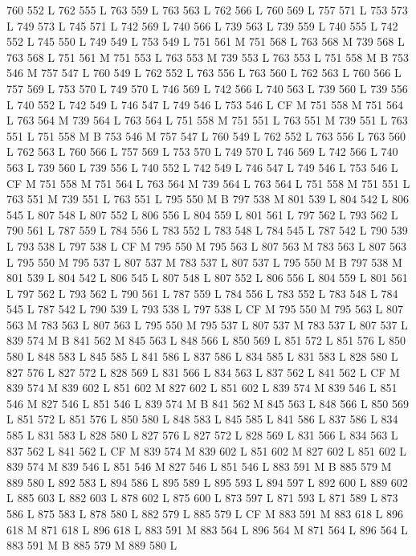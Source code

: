{{{{{{{{{{{{{{{{{{760 552 L
762 555 L
763 559 L
763 563 L
762 566 L
760 569 L
757 571 L
753 573 L
749 573 L
745 571 L
742 569 L
740 566 L
739 563 L
739 559 L
740 555 L
742 552 L
745 550 L
749 549 L
753 549 L
751 561 M 751 568 L
763 568 M 739 568 L
763 568 L
751 561 M 751 553 L
763 553 M 739 553 L
763 553 L
751 558 M B
753 546 M 757 547 L
760 549 L
762 552 L
763 556 L
763 560 L
762 563 L
760 566 L
757 569 L
753 570 L
749 570 L
746 569 L
742 566 L
740 563 L
739 560 L
739 556 L
740 552 L
742 549 L
746 547 L
749 546 L
753 546 L
CF M
751 558 M 751 564 L
763 564 M 739 564 L
763 564 L
751 558 M 751 551 L
763 551 M 739 551 L
763 551 L
751 558 M B
753 546 M 757 547 L
760 549 L
762 552 L
763 556 L
763 560 L
762 563 L
760 566 L
757 569 L
753 570 L
749 570 L
746 569 L
742 566 L
740 563 L
739 560 L
739 556 L
740 552 L
742 549 L
746 547 L
749 546 L
753 546 L
CF M
751 558 M 751 564 L
763 564 M 739 564 L
763 564 L
751 558 M 751 551 L
763 551 M 739 551 L
763 551 L
795 550 M B
797 538 M 801 539 L
804 542 L
806 545 L
807 548 L
807 552 L
806 556 L
804 559 L
801 561 L
797 562 L
793 562 L
790 561 L
787 559 L
784 556 L
783 552 L
783 548 L
784 545 L
787 542 L
790 539 L
793 538 L
797 538 L
CF M
795 550 M 795 563 L
807 563 M 783 563 L
807 563 L
795 550 M 795 537 L
807 537 M 783 537 L
807 537 L
795 550 M B
797 538 M 801 539 L
804 542 L
806 545 L
807 548 L
807 552 L
806 556 L
804 559 L
801 561 L
797 562 L
793 562 L
790 561 L
787 559 L
784 556 L
783 552 L
783 548 L
784 545 L
787 542 L
790 539 L
793 538 L
797 538 L
CF M
795 550 M 795 563 L
807 563 M 783 563 L
807 563 L
795 550 M 795 537 L
807 537 M 783 537 L
807 537 L
839 574 M B
841 562 M 845 563 L
848 566 L
850 569 L
851 572 L
851 576 L
850 580 L
848 583 L
845 585 L
841 586 L
837 586 L
834 585 L
831 583 L
828 580 L
827 576 L
827 572 L
828 569 L
831 566 L
834 563 L
837 562 L
841 562 L
CF M
839 574 M 839 602 L
851 602 M 827 602 L
851 602 L
839 574 M 839 546 L
851 546 M 827 546 L
851 546 L
839 574 M B
841 562 M 845 563 L
848 566 L
850 569 L
851 572 L
851 576 L
850 580 L
848 583 L
845 585 L
841 586 L
837 586 L
834 585 L
831 583 L
828 580 L
827 576 L
827 572 L
828 569 L
831 566 L
834 563 L
837 562 L
841 562 L
CF M
839 574 M 839 602 L
851 602 M 827 602 L
851 602 L
839 574 M 839 546 L
851 546 M 827 546 L
851 546 L
883 591 M B
885 579 M 889 580 L
892 583 L
894 586 L
895 589 L
895 593 L
894 597 L
892 600 L
889 602 L
885 603 L
882 603 L
878 602 L
875 600 L
873 597 L
871 593 L
871 589 L
873 586 L
875 583 L
878 580 L
882 579 L
885 579 L
CF M
883 591 M 883 618 L
896 618 M 871 618 L
896 618 L
883 591 M 883 564 L
896 564 M 871 564 L
896 564 L
883 591 M B
885 579 M 889 580 L
}}}}}}}}}}}}}}}}}}
